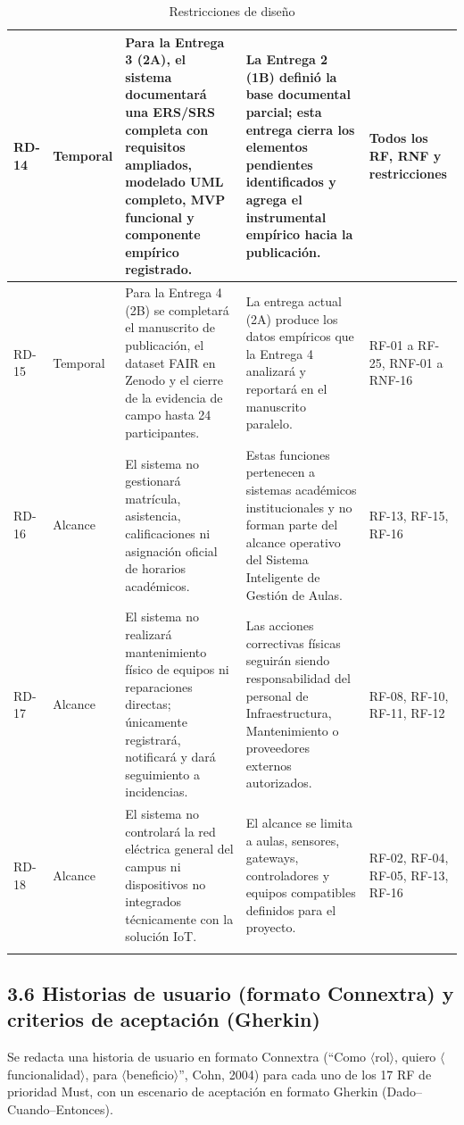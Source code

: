 \begin{longtable}{|p{3.1cm}|p{3.1cm}|p{3.1cm}|p{3.1cm}|p{3.1cm}|}
RD-14 & Temporal & Para la Entrega 3 (2A), el sistema documentará una ERS/SRS completa con requisitos ampliados, modelado UML completo, MVP funcional y componente empírico registrado. & La Entrega 2 (1B) definió la base documental parcial; esta entrega cierra los elementos pendientes identificados y agrega el instrumental empírico hacia la publicación. & Todos los RF, RNF y restricciones \\ \hline
RD-15 & Temporal & Para la Entrega 4 (2B) se completará el manuscrito de publicación, el dataset FAIR en Zenodo y el cierre de la evidencia de campo hasta 24 participantes. & La entrega actual (2A) produce los datos empíricos que la Entrega 4 analizará y reportará en el manuscrito paralelo. & RF-01 a RF-25, RNF-01 a RNF-16 \\ \hline
RD-16 & Alcance & El sistema no gestionará matrícula, asistencia, calificaciones ni asignación oficial de horarios académicos. & Estas funciones pertenecen a sistemas académicos institucionales y no forman parte del alcance operativo del Sistema Inteligente de Gestión de Aulas. & RF-13, RF-15, RF-16 \\ \hline
RD-17 & Alcance & El sistema no realizará mantenimiento físico de equipos ni reparaciones directas; únicamente registrará, notificará y dará seguimiento a incidencias. & Las acciones correctivas físicas seguirán siendo responsabilidad del personal de Infraestructura, Mantenimiento o proveedores externos autorizados. & RF-08, RF-10, RF-11, RF-12 \\ \hline
RD-18 & Alcance & El sistema no controlará la red eléctrica general del campus ni dispositivos no integrados técnicamente con la solución IoT. & El alcance se limita a aulas, sensores, gateways, controladores y equipos compatibles definidos para el proyecto. & RF-02, RF-04, RF-05, RF-13, RF-16 \\ \hline
\caption{Restricciones de diseño}
\end{longtable}
\endgroup

\subsection*{3.6 Historias de usuario (formato Connextra) y criterios de aceptación (Gherkin)}


Se redacta una historia de usuario en formato Connextra (``Como \(\langle\)rol\(\rangle\), quiero \(\langle\)funcionalidad\(\rangle\), para \(\langle\)beneficio\(\rangle\)'', Cohn, 2004) para cada uno de los 17 RF de prioridad Must, con un escenario de aceptación en formato Gherkin (Dado--Cuando--Entonces).


